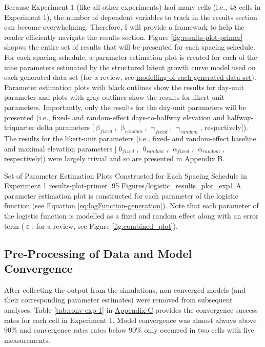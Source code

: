 \documentclass[
12pt, %
twoside,
english]{guelphthesis}
\theoremstyle{definition}
\theoremstyle{definition}
\theoremstyle{definition}
\theoremstyle{definition}
\theoremstyle{remark}
\begin{document}
Because Experiment 1 (like all other experiments) had many cells (i.e., 48 cells in Experiment 1), the number of dependent variables to track in the results section can become overwhelming. Therefore, I will provide a framework to help the reader efficiently navigate the results section. Figure \ref{fig:results-plot-primer} shopws the entire set of results that will be presented for each spacing schedule. For each spacing schedule, a parameter estimation plot is created for each of the nine parameters estimated by the structured latent growth curve model used on each generated data set (for a review, see \protect\hyperlink{modelling-data-sets}{modelling of each generated data set}). Parameter estimation plots with black outlines show the results for day-unit parameter and plots with gray outlines show the results for likert-unit parameters. Importantly, only the results for the day-unit parameters will be presented (i.e., fixed- and random-effect days-to-halfway elevation and halfway-triquarter delta parameters {[}\(\upbeta_{fixed}\), \(\upbeta_{random}\), \(\upgamma_{fixed}\), \(\upgamma_{random}\), respectively{]}). The results for the likert-unit parameters (i.e., fixed- and random-effect baseline and maximal elevation parameters {[}\(\uptheta_{fixed}\), \(\uptheta_{random}\), \(\upalpha_{fixed}\), \(\upalpha_{random}\), respectively{]}) were largely trivial and so are presented in \protect\hyperlink{appendix-b}{Appendix B}.
\begin{apaFigure}
[portrait]
[samepage]
[-0.2cm]
{Set of Parameter Estimation Plots Constructed for Each Spacing Schedule in Experiment 1}
{results-plot-primer}
{.95}
{Figures/logistic_results_plot_exp1}
{A parameter estimation plot is constructed for each parameter of the logistic function (see Equation \ref{eq:logFunction-generation}). Note that each parameter of the logistic function is modelled as a fixed and random effect along with an error term ($\upepsilon$; for a review, see Figure \ref{fig:combined_plot}).}
\end{apaFigure}
\hypertarget{pre-processing-of-data-and-model-convergence}{%
\subsection{Pre-Processing of Data and Model Convergence}\label{pre-processing-of-data-and-model-convergence}}

After collecting the output from the simulations, non-converged models
(and their corresponding parameter estimates) were removed from
subsequent analyses. Table \ref{tab:conv-exp-1} in \protect\hyperlink{appendix-c-convergence-rates}{Appendix C} provides the convergence
success rates for each cell in Experiment 1. Model convergence was almost always above 90\% and convergence rates
rates below 90\% only occurred in two cells with five measurements.
\end{document}
